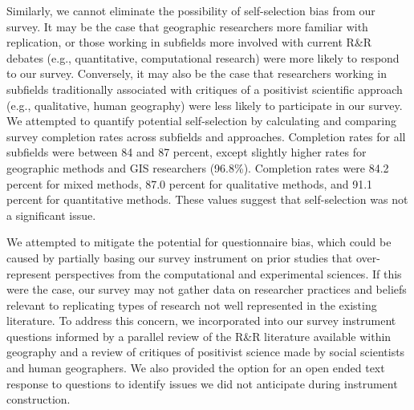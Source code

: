 \documentclass[]{interact}
\theoremstyle{plain}%
\theoremstyle{definition}
\theoremstyle{remark}
\begin{document}
Similarly, we cannot eliminate the possibility of self-selection bias from our survey. 
It may be the case that geographic researchers more familiar with replication, or those working in subfields more involved with current R\&R debates (e.g., quantitative, computational research) were more likely to respond to our survey. 
Conversely, it may also be the case that researchers working in subfields traditionally associated with critiques of a positivist scientific approach (e.g., qualitative, human geography) were less likely to participate in our survey. 
We attempted to quantify potential self-selection by calculating and comparing survey completion rates across subfields and approaches. 
Completion rates for all subfields were between 84 and 87 percent, except slightly higher rates for geographic methods and GIS researchers (96.8\%).
Completion rates were 84.2 percent for mixed methods, 87.0 percent for qualitative methods, and 91.1 percent for quantitative methods. 
These values suggest that self-selection was not a significant issue.

We attempted to mitigate the potential for questionnaire bias, which could be caused by partially basing our survey instrument on prior studies that over-represent perspectives from the computational and experimental sciences.
If this were the case, our survey may not gather data on researcher practices and beliefs relevant to replicating types of research not well represented in the existing literature. 
To address this concern, we incorporated into our survey instrument questions informed by a parallel review of the R\&R literature available within geography and a review of critiques of positivist science made by social scientists and human geographers.
We also provided the option for an open ended text response to questions to identify issues we did not anticipate during instrument construction.  
\end{document}
